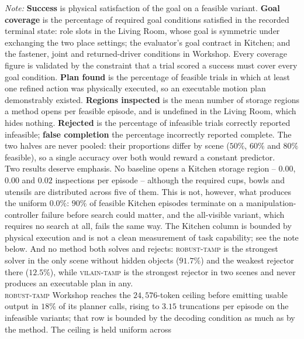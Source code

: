 \begin{table}[t]
\vspace{3pt}
\begin{minipage}{0.98\textwidth}
\footnotesize
\textit{Note:}
\textbf{Success} is physical satisfaction of the goal on a feasible variant.
\textbf{Goal coverage} is the percentage of required goal conditions satisfied
in the recorded terminal state: role slots in the Living Room, whose goal is
symmetric under exchanging the two place settings; the evaluator's goal
contract in Kitchen; and the fastener, joint and returned-driver conditions in
Workshop. Every coverage figure is validated by the constraint that a trial
scored a success must cover every goal condition.
\textbf{Plan found} is the percentage of feasible trials in which at least one
refined action was physically executed, so an executable motion plan
demonstrably existed.
\textbf{Regions inspected} is the mean number of storage regions a method opens
per feasible episode, and is undefined in the Living Room, which hides nothing.
\textbf{Rejected} is the percentage of infeasible trials correctly reported
infeasible; \textbf{false completion} the percentage incorrectly reported
complete. The two halves are never pooled: their proportions differ by scene
($50\%$, $60\%$ and $80\%$ feasible), so a single accuracy over both would
reward a constant predictor.
\\[2pt]
Two results deserve emphasis. No baseline opens a Kitchen storage region --
$0.00$, $0.00$ and $0.02$ inspections per episode -- although the required
cups, bowls and utensils are distributed across five of them. This is not,
however, what produces the uniform $0.0\%$: $90\%$ of feasible Kitchen
episodes terminate on a manipulation-controller failure before search could
matter, and the all-visible variant, which requires no search at all, fails
the same way. The Kitchen column is bounded by physical execution and is not
a clean measurement of task capability; see the note below.
And no method both solves and rejects: \textsc{robust-tamp} is the strongest
solver in the only scene without hidden objects ($91.7\%$) and the weakest
rejector there ($12.5\%$), while \textsc{vilain-tamp} is the strongest rejector
in two scenes and never produces an executable plan in any.
\\[2pt]
\textsc{robust-tamp} Workshop reaches the $24{,}576$-token ceiling before
emitting usable output in $18\%$ of its planner calls, rising to $3.15$
truncations per episode on the infeasible variants; that row is bounded by the
decoding condition as much as by the method. The ceiling is held uniform across

\end{minipage}
\end{table}
